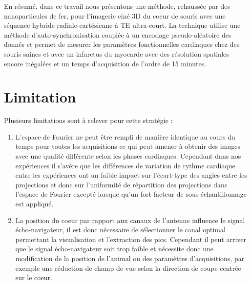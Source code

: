 En résumé, dans ce travail nous présentons une méthode, rehaussée par des nanoparticules de fer, pour l’imagerie ciné 3D du coeur de souris avec une séquence hybride radiale-cartésienne à TE ultra-court. La technique utilise une méthode d’auto-synchronisation couplée à un encodage pseudo-aléatoire des donnés et permet de mesurer les paramètres fonctionnelles cardiaques chez des souris saines et avec un infarctus du myocarde avec des résolution spatiales encore inégalées et un temps d’acquisition de l’ordre de 15 minutes. 


\section{Limitation}

Plusieurs limitations sont à relever pour cette stratégie :
\begin{enumerate}
\item L'espace de Fourier ne peut être rempli de manière identique au cours du temps pour toutes les acquisitions ce qui peut amener à obtenir des images avec une qualité différente selon les phases cardiaques. Cependant dans nos expériences il s'avère que les différences de variation de rythme cardiaque entre les expériences ont un faible impact sur l'écart-type des angles entre les projections et donc sur l'uniformité de répartition des projections dans l'espace de Fourier excepté lorsque qu'un fort facteur de sous-échantillonnage est appliqué.

\item La position du coeur par rapport aux canaux de l'antenne influence le signal écho-navigateur, il est donc nécessaire de sélectionner le canal optimal permettant la visualisation et l'extraction des pics. Cependant il peut arriver que le signal écho-navigateur soit trop faible et nécessite donc une modification de la position de l'animal ou des paramètres d'acquisitions, par exemple une réduction de champ de vue selon la direction de coupe centrée sur le coeur.
\end{enumerate} 

